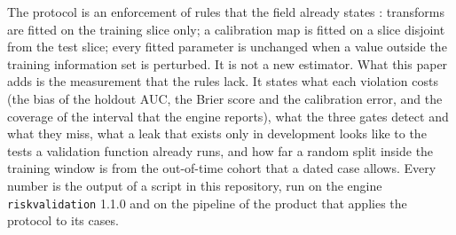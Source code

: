 The protocol is an enforcement of rules that the field already states \citep{hastie2009,siddiqi2017,kaufman2012}: transforms are fitted on the training slice only; a calibration map is fitted on a slice disjoint from the test slice; every fitted parameter is unchanged when a value outside the training information set is perturbed. It is not a new estimator. What this paper adds is the measurement that the rules lack. It states what each violation costs (the bias of the holdout AUC, the Brier score and the calibration error, and the coverage of the interval that the engine reports), what the three gates detect and what they miss, what a leak that exists only in development looks like to the tests a validation function already runs, and how far a random split inside the training window is from the out-of-time cohort that a dated case allows. Every number is the output of a script in this repository, run on the engine \texttt{riskvalidation} 1.1.0 and on the pipeline of the product that applies the protocol to its cases.

